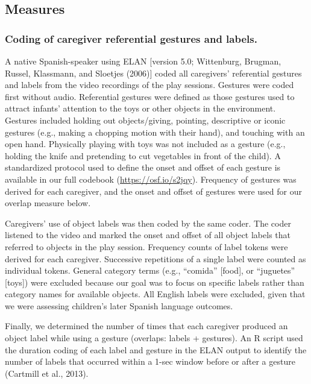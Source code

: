 \documentclass[
  man,floatsintext]{apa6}
\begin{document}
\hypertarget{measures}{%
\subsection{Measures}\label{measures}}

\hypertarget{coding-of-caregiver-referential-gestures-and-labels.}{%
\subsubsection{Coding of caregiver referential gestures and labels.}\label{coding-of-caregiver-referential-gestures-and-labels.}}

A native Spanish-speaker using ELAN {[}version 5.0; Wittenburg, Brugman, Russel, Klassmann, and Sloetjes (2006){]} coded all caregivers' referential gestures and labels from the video recordings of the play sessions. Gestures were coded first without audio. Referential gestures were defined as those gestures used to attract infants' attention to the toys or other objects in the environment. Gestures included holding out objects/giving, pointing, descriptive or iconic gestures (e.g., making a chopping motion with their hand), and touching with an open hand. Physically playing with toys was not included as a gesture (e.g., holding the knife and pretending to cut vegetables in front of the child). A standardized protocol used to define the onset and offset of each gesture is available in our full codebook (\url{https://osf.io/s2jqy}). Frequency of gestures was derived for each caregiver, and the onset and offset of gestures were used for our overlap measure below.

Caregivers' use of object labels was then coded by the same coder. The coder listened to the video and marked the onset and offset of all object labels that referred to objects in the play session. Frequency counts of label tokens were derived for each caregiver. Successive repetitions of a single label were counted as individual tokens. General category terms (e.g., ``comida'' {[}food{]}, or ``juguetes'' {[}toys{]}) were excluded because our goal was to focus on specific labels rather than category names for available objects. All English labels were excluded, given that we were assessing children's later Spanish language outcomes.

Finally, we determined the number of times that each caregiver produced an object label while using a gesture (overlaps: labels + gestures). An R script used the duration coding of each label and gesture in the ELAN output to identify the number of labels that occurred within a 1-sec window before or after a gesture (Cartmill et al., 2013).
\end{document}
